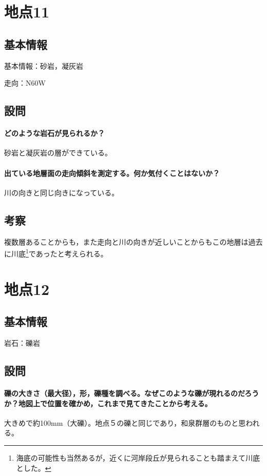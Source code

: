 \documentclass[uplatex,b5paper]{jsreport}
\begin{document}
  \section{地点11}
    \subsection{基本情報}
    基本情報：砂岩，凝灰岩\par
    走向：N60\textdegree W
    \subsection{設問}
      \paragraph{どのような岩石が見られるか？}
      砂岩と凝灰岩の層ができている。
      \paragraph{出ている地層面の走向傾斜を測定する。何か気付くことはないか？}
      川の向きと同じ向きになっている。
    \subsection{考察}
    複数層あることからも，また走向と川の向きが近しいことからもこの地層は過去に川底\footnote{海底の可能性も当然あるが，近くに河岸段丘が見られることも踏まえて川底とした。}であったと考えられる。
  \clearpage

  \section{地点12}
    \subsection{基本情報}
    岩石：礫岩
    \subsection{設問}
      \paragraph{礫の大きさ（最大径），形，礫種を調べる。なぜこのような礫が現れるのだろうか？地図上で位置を確かめ，これまで見てきたことから考える。}
      大きめで約100mm（大礫）。地点５の礫と同じであり，和泉群層のものと思われる。
\end{document}
